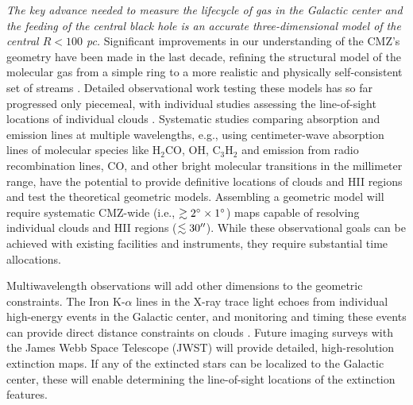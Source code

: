 \documentclass[modern]{aastex62}
\begin{document}
\textit{The key advance needed to measure the lifecycle of gas in the Galactic center and the feeding of the central black hole is an accurate three-dimensional
model of the central $R<100$ pc.} Significant improvements in our understanding
of the CMZ's geometry have been made in the last decade, refining the structural
model of the molecular gas from a simple ring to a more realistic and physically
self-consistent set of streams
\citep{Molinari2011a,Kruijssen2015a,Ridley2017a,Sormani2018a,Kruijssen2019}.  Detailed observational work testing these models has so far progressed only piecemeal, with individual studies assessing the line-of-sight locations of individual clouds \citep[e.g.][]{Butterfield2018a}. Systematic studies comparing absorption and emission lines at multiple wavelengths, e.g., using centimeter-wave absorption lines of molecular species like H$_2$CO, OH, C$_3$H$_2$ and emission from radio recombination lines, CO, and other bright molecular transitions in the millimeter range, have the potential to provide definitive locations of clouds and HII regions and test the theoretical geometric models.  Assembling a geometric model will require systematic CMZ-wide (i.e., $\gtrsim2^{\circ}\times1^{\circ}$) maps capable of resolving individual clouds and HII regions ($\lesssim30\mbox{$^{\prime\prime}$}$).  While these observational goals can be achieved with existing facilities and instruments, they require substantial time allocations.

Multiwavelength observations will add other dimensions to the geometric constraints.
The Iron K-$\alpha$ lines in the X-ray trace light echoes from individual high-energy events in the Galactic center, and monitoring and timing these events can provide direct distance constraints on clouds \citep[e.g.][]{Clavel2014a,Churazov2017b,Churazov2017a,Terrier2018a}. Future imaging surveys with the James Webb Space Telescope (JWST) will provide detailed, high-resolution extinction maps. If any of the extincted stars can be localized to the Galactic center, these will enable determining the line-of-sight locations of the extinction features.
\end{document}
